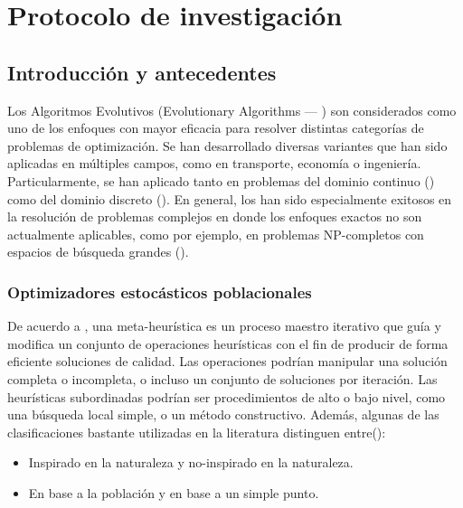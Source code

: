 \chapter{Protocolo de investigación}

\section{Introducción y antecedentes}
Los Algoritmos Evolutivos (Evolutionary Algorithms --- \EAS{}) son considerados como uno de los enfoques con mayor 
eficacia para resolver distintas categorías de problemas de optimización.
%
Se han desarrollado diversas variantes que han sido aplicadas en múltiples campos, como en transporte, economía o ingeniería.
%
Particularmente, se han aplicado tanto en problemas del dominio continuo (\cite{glover2005handbook}) como del 
dominio discreto (\cite{Joel:Dynamic_FAP}).
%
En general, los \EAS{} han sido especialmente exitosos en la resolución de problemas complejos en donde los enfoques exactos 
no son actualmente aplicables, como por ejemplo, en problemas NP-completos con espacios de búsqueda 
grandes (\cite{chakraborty2008advances}).
% 
\subsection{Optimizadores estocásticos poblacionales}

De acuerdo a \cite{voss2012meta}, una meta-heurística es un proceso maestro iterativo que guía y modifica un conjunto de operaciones 
heurísticas con el fin de producir de forma eficiente soluciones de calidad. 
%
Las operaciones podrían manipular una solución completa o incompleta, o incluso un conjunto de soluciones por iteración.
%
Las heurísticas subordinadas podrían ser procedimientos de alto o bajo nivel, como una búsqueda local simple, o un método 
constructivo.
%
Además, algunas de las clasificaciones bastante utilizadas en la literatura distinguen entre(\cite{beheshti2013review}):
\begin{itemize}
    \item Inspirado en la naturaleza y no-inspirado en la naturaleza.
    \item En base a la población y en base a un simple punto.
\end{itemize}

